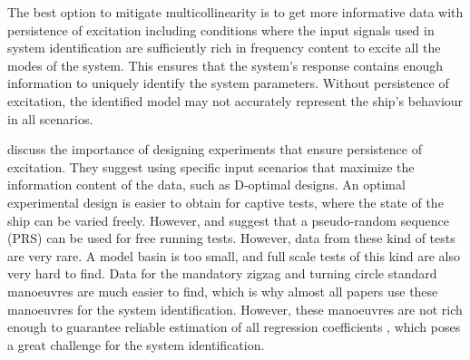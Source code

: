The best option to mitigate multicollinearity is to get more informative data with persistence of excitation including conditions where the input signals used in system identification are sufficiently rich in frequency content to excite all the modes of the system. This ensures that the system's response contains enough information to uniquely identify the system parameters. Without persistence of excitation, the identified model may not accurately represent the ship's behaviour in all scenarios.

\textcite{yoonIdentificationHydrodynamicCoefficients2003} discuss the importance of designing experiments that ensure persistence of excitation. They suggest using specific input scenarios that maximize the information content of the data, such as D-optimal designs. An optimal experimental design is easier to obtain for captive tests, where the state of the ship can be varied freely. However, \textcite{wangOptimalDesignExcitation2020} and \textcite{millerShipModelIdentification2021} suggest that a pseudo-random sequence (PRS) can be used for free running tests.  However, data from these kind of tests are very rare. A model basin is too small, and full scale tests of this kind are also very hard to find. 
Data for the mandatory zigzag and turning circle standard manoeuvres \cite{imoStandardsShipManoeuvrability2002} are much easier to find, which is why almost all papers use these manoeuvres for the system identification. However, these manoeuvres are not rich enough to guarantee reliable estimation of all regression coefficients \cite{sutuloAlgorithmOfflineIdentification2014}, which poses a great challenge for the system identification.

